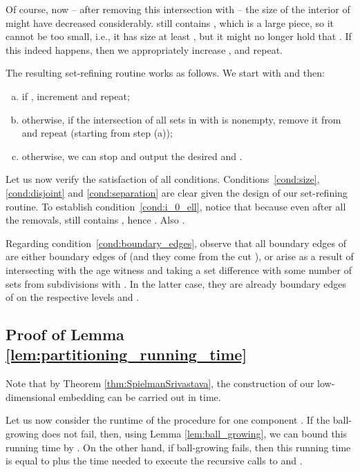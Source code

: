 \documentclass[11pt, letterpaper]{article}
\begin{document}
Of course, now -- after removing this intersection with  -- the size  of the interior of  might have decreased considerably.  still contains , which is a large piece, so it cannot be too small, i.e., it has size at least , but it might no longer hold that . If this indeed happens, then we appropriately increase , and repeat.

The resulting set-refining routine works as follows. We start with  and then:
\begin{enumerate}[(a)]\addtolength{\itemsep}{-.3\baselineskip}
	\item if , increment  and repeat;
	\item otherwise, if the intersection of all sets in  with  is nonempty, remove it from  and repeat (starting from step (a));
	\item otherwise, we can stop and output the desired  and .
\end{enumerate}

Let us now verify the satisfaction of all conditions. Conditions~\eqref{cond:size}, \eqref{cond:disjoint} and \eqref{cond:separation} are clear given the design of our set-refining routine. To establish condition~\eqref{cond:i_0_ell}, notice that  because even after all the removals,  still contains , hence . Also .

Regarding condition~\eqref{cond:boundary_edges}, observe that all boundary edges of  are either boundary edges of  (and they come from the cut ), or arise as a result of intersecting  with the age witness  and taking a set difference with some number of sets from subdivisions  with . In the latter case, they are already boundary edges of  on the respective levels  and .

\subsection{Proof of Lemma \ref{lem:partitioning_running_time}} \label{app:partitioning_running_time}

Note that by Theorem \ref{thm:SpielmanSrivastava}, the construction of our low-dimensional embedding  can be carried out in  time.

Let us now consider the runtime of the  procedure for one component . If the ball-growing does not fail, then, using Lemma \ref{lem:ball_growing}, we can bound this running time by . On the other hand, if ball-growing fails, then this running time is equal to  plus the time needed to execute the recursive calls to  and . 
\end{document}
